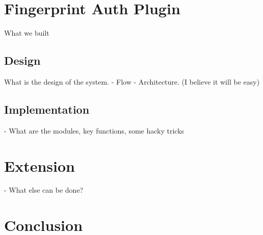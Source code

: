 \documentclass{acm_proc_article-sp}
\begin{document}
\section{Fingerprint Auth Plugin}
What we built
\subsection{Design}
What is the design of the system. 
- Flow
- Architecture. (I believe it will be easy)

\subsection{Implementation}
- What are the modules, key functions, some hacky tricks


\section{Extension}
- What else can be done?


\section{Conclusion}





%
% 
% 
% 
%
\end{document}
